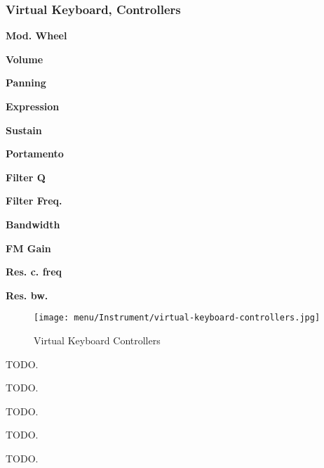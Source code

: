 \subsubsection{Virtual Keyboard, Controllers}
\label{subsubsec:virtual_keyboard_controllers}

   \begin{enumber}
      \item \textbf{Mod. Wheel}
      \item \textbf{Volume}
      \item \textbf{Panning}
      \item \textbf{Expression}
      \item \textbf{Sustain}
      \item \textbf{Portamento}
      \item \textbf{Filter Q}
      \item \textbf{Filter Freq.}
      \item \textbf{Bandwidth}
      \item \textbf{FM Gain}
      \item \textbf{Res. c. freq}
      \item \textbf{Res. bw.}
   \end{enumber}


\begin{figure}[H]
   \centering 
   \texttt{[image: menu/Instrument/virtual-keyboard-controllers.jpg]}
   \caption{Virtual Keyboard Controllers}
   \label{fig:virtual_keyboard_controllers}
\end{figure}

   \setcounter{ItemCounter}{0}      %


   TODO.


   TODO.


   TODO.


   TODO.


   TODO.


